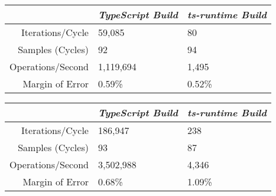 \begin{center}
{
\centering
\tabulinesep=1.2mm
\setlength{\tabcolsep}{5mm}
\def\arraystretch{1.25}
\small
\begin{tabu} to \textwidth {|r||X[c,m]|X[c,m]|}
  \hline
  & \emph{TypeScript Build} & \emph{ts-runtime Build} \\
  \hline
  \hline
  Iterations/Cycle  & 59,085 & 80 \\
  \hline
  Samples (Cycles)  & 92 & 94 \\
  \hline
  Operations/Second & 1,119,694 & 1,495 \\
  \hline
  Margin of Error   & 0.59\% & 0.52\% \\
  \hline
\end{tabu}
}
\end{center}

\begin{center}
{
\centering
\tabulinesep=1.2mm
\setlength{\tabcolsep}{5mm}
\def\arraystretch{1.25}
\small
\begin{tabu} to \textwidth {|r||X[c,m]|X[c,m]|}
  \hline
  & \emph{TypeScript Build} & \emph{ts-runtime Build} \\
  \hline
  \hline
  Iterations/Cycle  & 186,947 & 238 \\
  \hline
  Samples (Cycles)  & 93 & 87 \\
  \hline
  Operations/Second & 3,502,988 & 4,346 \\
  \hline
  Margin of Error   & 0.68\% & 1.09\% \\
  \hline
\end{tabu}
}
\end{center}
